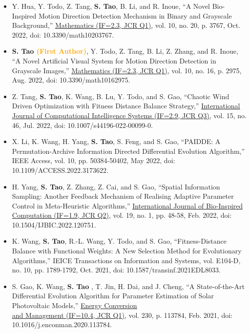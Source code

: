 \documentclass[11pt,a4paper,sans]{moderncv}
\renewcommand{\underline}[1]{\uline{#1}}
\begin{document}
{\begin{itemize}[label=\textbullet]
      \item [7)] Y. Hua, Y. Todo, Z. Tang, \textbf{S. Tao}, B. Li, and R. Inoue, “A Novel Bio-Inspired Motion Direction Detection Mechanism in Binary and Grayscale Background,” \color{black}\href{https://www.mdpi.com/journal/mathematics}{\underline{Mathematics (IF=2.3, JCR Q1)}}, vol. 10, no. 20, p. 3767, Oct. 2022, doi: 10.3390/math10203767.
      
      \item [6)] \textbf{S. Tao \textcolor{orange}{(First Author)}}, Y. Todo, Z. Tang, B. Li, Z. Zhang, and R. Inoue, “A Novel Artificial Visual System for Motion Direction Detection in Grayscale Images,” \color{black}\href{https://www.mdpi.com/journal/mathematics}{\underline{Mathematics (IF=2.3, JCR Q1)}}, vol. 10, no. 16, p. 2975, Aug. 2022, doi: 10.3390/math10162975.
      
      \item [5)] Z. Tang, \textbf{S. Tao}, K. Wang, B. Lu, Y. Todo, and S. Gao, “Chaotic Wind Driven Optimization with Fitness Distance Balance Strategy,” \color{black}\href{https://link.springer.com/journal/44196}{\underline{International Journal of Computational Intelligence Systems (IF=2.9, JCR Q3)}}, vol. 15, no. 46, Jul. 2022, doi: 10.1007/s44196-022-00099-0.
      
      \item [4)] X. Li, K. Wang, H. Yang, \textbf{S. Tao}, S. Feng, and S. Gao, “PAIDDE: A Permutation-Archive Information Directed Differential Evolution Algorithm,” IEEE Access, vol. 10, pp. 50384-50402, May 2022, doi: 10.1109/ACCESS.2022.3173622.
      
      \item [3)] H. Yang, \textbf{S. Tao}, Z. Zhang, Z. Cai, and S. Gao, “Spatial Information Sampling: Another Feedback Mechanism of Realising Adaptive Parameter Control in Meta-Heuristic Algorithms,” \color{black}\href{https://www.inderscience.com/jhome.php?jcode=ijbic}{\underline{International Journal of Bio-Inspired Computation (IF=1.9, JCR Q2)}}, vol. 19, no. 1, pp. 48-58, Feb. 2022, doi: 10.1504/IJBIC.2022.120751.
      
      \item [2)] K. Wang, \textbf{S. Tao}, R.-L. Wang, Y. Todo, and S. Gao, “Fitness-Distance Balance with Functional Weights: A New Selection Method for Evolutionary Algorithms,” IEICE Transactions on Information and Systems, vol. E104-D, no. 10, pp. 1789-1792, Oct. 2021, doi: 10.1587/transinf.2021EDL8033.
      
      \item [1)] S. Gao, K. Wang, \textbf{S. Tao \color{orange}{(Clarivate 2021 ESI Highly Cited Paper, Top 1\%)}}, T. Jin, H. Dai, and J. Cheng, “A State-of-the-Art Differential Evolution Algorithm for Parameter Estimation of Solar Photovoltaic Models,” \color{black}\href{https://www.sciencedirect.com/journal/energy-conversion-and-management}{\underline{Energy Conversion }\\\underline{and Management (IF=10.4, JCR Q1)}}, vol. 230, p. 113784, Feb. 2021, doi: 10.1016/j.enconman.2020.113784. 

  \end{itemize}} 
\end{document}
